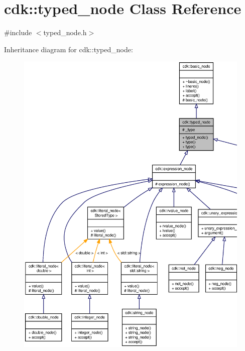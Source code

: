 \section{cdk\+:\+:typed\+\_\+node Class Reference}
\label{classcdk_1_1typed__node}


{\ttfamily \#include $<$typed\+\_\+node.\+h$>$}



Inheritance diagram for cdk\+:\+:typed\+\_\+node\+:
\nopagebreak
\begin{figure}[H]
\begin{center}
\leavevmode
\includegraphics[width=350pt]{classcdk_1_1typed__node__inherit__graph}
\end{center}
\end{figure}


